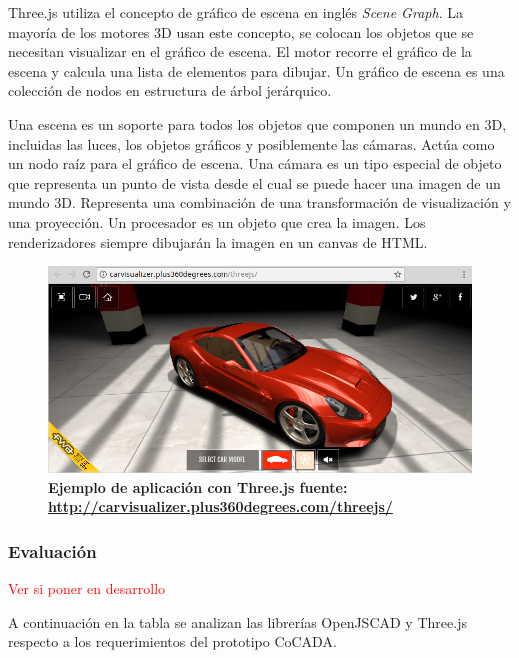 Three.js utiliza el concepto de gráfico de escena en inglés \textit{Scene Graph}. La mayoría de los motores 3D usan este concepto, se colocan los objetos que se necesitan visualizar en el gráfico de escena. El motor recorre el gráfico de la escena y calcula una lista de elementos para dibujar. Un gráfico de escena es una colección de nodos en estructura de árbol jerárquico.

Una escena es un soporte para todos los objetos que componen un mundo en 3D, incluidas las luces, los objetos gráficos y posiblemente las cámaras. Actúa como un nodo raíz para el gráfico de escena. Una cámara es un tipo especial de objeto que representa un punto de vista desde el cual se puede hacer una imagen de un mundo 3D. Representa una combinación de una transformación de visualización y una proyección. Un procesador es un objeto que crea la imagen. Los renderizadores siempre dibujarán la imagen en un canvas de HTML.

\begin{figure}[h]
\includegraphics[width=15cm]{Img/WEB/web-three.jpg}
\centering
\caption{\textbf{\footnotesize{Ejemplo de aplicación con Three.js fuente: \url{http://carvisualizer.plus360degrees.com/threejs/} }}}
\label{fig:threejs}
\end{figure}

\clearpage
\subsubsection{Evaluación} \textcolor{red}{Ver si poner en desarrollo}

A continuación en la tabla se analizan las librerías OpenJSCAD y Three.js respecto a los requerimientos del prototipo CoCADA.

